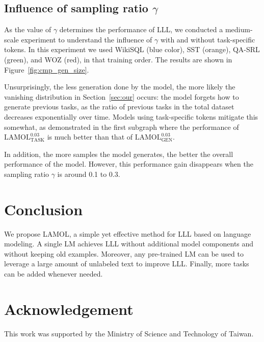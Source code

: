\documentclass{article} %
\begin{document}
\subsection{Influence of sampling ratio $\gamma$}
As the value of $\gamma$ determines the performance of LLL,
we conducted a medium-scale experiment to understand the influence of $\gamma$ with and without task-specific tokens.
In this experiment we used WikiSQL (blue color), SST (orange), QA-SRL (green), and WOZ (red), in that training order.
The results are shown in Figure~\ref{fig:cmp_gen_size}.

Unsurprisingly, the less generation done by the model, the more likely the vanishing distribution in Section~\ref{sec:our} occurs: the model forgets how to generate previous tasks, as the ratio of previous tasks in the total dataset decreases exponentially over time. 
Models using task-specific tokens mitigate this somewhat, as demonstrated in the first subgraph where the performance of $\text{LAMOL}_{\text{TASK}}^{0.03}$ is much better than that of $\text{LAMOL}_\text{GEN}^{0.03}$.

In addition, the more samples the model generates, the better the overall performance of the model.
However, this performance gain disappears when the sampling ratio $\gamma$ is around 0.1 to 0.3.



\section{Conclusion}

We propose LAMOL, a simple yet effective method for LLL based on language modeling.
A single LM achieves LLL without additional model components and without keeping old examples.
Moreover, any pre-trained LM can be used to leverage a large amount of unlabeled text to improve LLL.
Finally, more tasks can be added whenever needed. 

\section*{Acknowledgement}
This work was supported by the Ministry of Science and Technology of
Taiwan.



\end{document}
